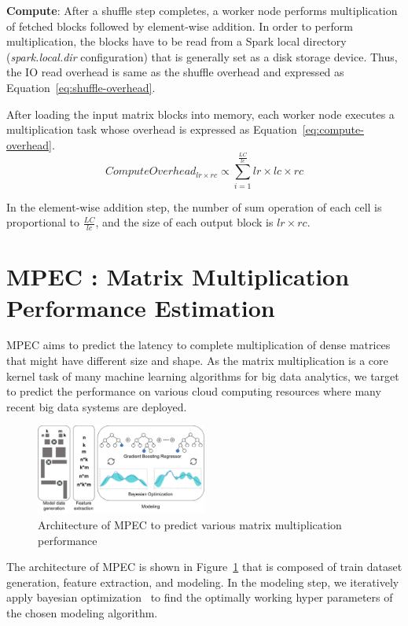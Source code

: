 \documentclass[10pt, conference, compsocconf]{IEEEtran}
\begin{document}
\textbf{Compute}: After a shuffle step completes, a worker node performs multiplication of fetched blocks followed by element-wise addition. In order to perform multiplication, the blocks have to be read from a Spark local directory (\textit{spark.local.dir} configuration) that is generally set as a disk storage device. Thus, the IO read overhead is same as the shuffle overhead and expressed as Equation~\ref{eq:shuffle-overhead}.

After loading the input matrix blocks into memory, each worker node executes a multiplication task whose overhead is expressed as Equation~\ref{eq:compute-overhead}.
\begin{equation}\label{eq:compute-overhead}
  ComputeOverhead_{lr \times rc} \propto \sum\limits_{i=1}^{\frac{LC}{lc}} lr \times lc \times rc
\end{equation}

In the element-wise addition step, the number of sum operation of each cell is proportional to $\frac{LC}{lc}$, and the size of each output block is $lr \times rc$.

\section{MPEC : Matrix Multiplication Performance Estimation}\label{sec:mpc-structure}
MPEC aims to predict the latency to complete multiplication of dense matrices that might have different size and shape. As the matrix multiplication is a core kernel task of many machine learning algorithms for big data analytics, we target to predict the performance on various cloud computing resources where many recent big data systems are deployed.

\begin{figure}
  \centering\includegraphics[width=0.5\textwidth]{figures/mpc-architecture.pdf}\caption{Architecture of MPEC to predict various matrix multiplication performance}\label{fig:mpc-architecture}
\end{figure}

The architecture of MPEC is shown in Figure~\ref{fig:mpc-architecture} that is composed of train dataset generation, feature extraction, and modeling. In the modeling step, we iteratively apply bayesian optimization~\cite{bayesian-optimization} to find the optimally working hyper parameters of the chosen modeling algorithm.
\end{document}
